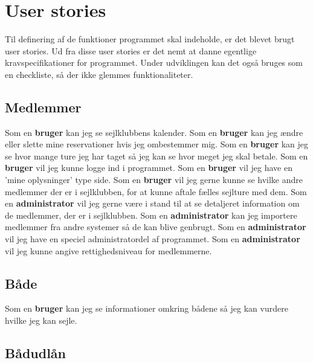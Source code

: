 \chapter{User stories}\label{User_stories}
Til definering af de funktioner programmet skal indeholde, er det blevet brugt user stories. 
Ud fra disse user stories er det nemt at danne egentlige kravspecifikationer for programmet. 
Under udviklingen kan det også bruges som en checkliste, så der ikke glemmes funktionaliteter. 

\section{Medlemmer}
Som en \textbf{bruger} kan jeg se sejlklubbens kalender.
\newline
Som en \textbf{bruger} kan jeg ændre eller slette mine reservationer hvis jeg ombestemmer mig.
\newline
Som en \textbf{bruger} kan jeg se hvor mange ture jeg har taget så jeg kan se hvor meget jeg skal betale.
\newline
Som en \textbf{bruger} vil jeg kunne logge ind i programmet.
\newline
Som en \textbf{bruger} vil jeg have en 'mine oplysninger' type side.
\newline
Som en \textbf{bruger} vil jeg gerne kunne se hvilke andre medlemmer der er i sejlklubben, for at kunne aftale fælles sejlture med dem.
\newline
Som en \textbf{administrator} vil jeg gerne være i stand til at se detaljeret information om de medlemmer, der er i sejlklubben.
\newline
Som en \textbf{administrator} kan jeg importere medlemmer fra andre systemer så de kan blive genbrugt.
\newline
Som en \textbf{administrator} vil jeg have en speciel administratordel af programmet.
\newline
Som en \textbf{administrator} vil jeg kunne angive rettighedsniveau for medlemmerne.

\section{Både}

Som en \textbf{bruger} kan jeg se informationer omkring bådene så jeg kan vurdere hvilke jeg kan sejle.

\section{Bådudlån}

